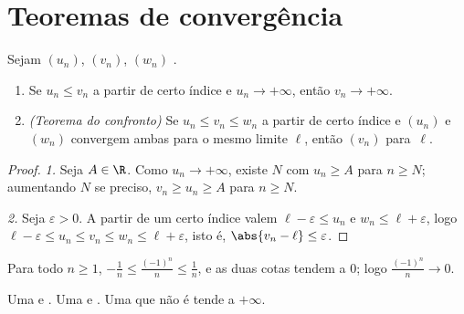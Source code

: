 \section{Teoremas de convergência}

\begin{theorem}\label{thm:g12:seq:squeeze}
Sejam $(u_n)$, $(v_n)$, $(w_n)$ .
\begin{enumerate}
  \item Se $u_n \leq v_n$ a partir de certo índice e $u_n \to +\infty$,
        então $v_n \to +\infty$.
  \item \emph{(Teorema do confronto)} Se
        $u_n \leq v_n \leq w_n$ a partir de certo índice e $(u_n)$ e
        $(w_n)$ convergem ambas para o mesmo limite $\ell$, então $(v_n)$
         para~$\ell$.
\end{enumerate}
\end{theorem}

\begin{proof}
\emph{1.} Seja $A \in \R$. Como $u_n \to +\infty$, existe $N$ com
$u_n \geq A$ para $n \geq N$; aumentando $N$ se preciso,
$v_n \geq u_n \geq A$ para $n \geq N$.

\emph{2.} Seja $\varepsilon > 0$. A partir de um certo índice valem
$\ell - \varepsilon \leq u_n$ e $w_n \leq \ell + \varepsilon$, logo
$\ell - \varepsilon \leq u_n \leq v_n \leq w_n \leq \ell + \varepsilon$,
isto é, $\abs{v_n - \ell} \leq \varepsilon$.
\end{proof}

\begin{example}
Para todo $n \geq 1$,
$-\frac{1}{n} \leq \frac{(-1)^n}{n} \leq \frac{1}{n}$, e as duas cotas
tendem a $0$; logo $\frac{(-1)^n}{n} \to 0$.
\end{example}

\begin{theorem}\label{thm:g12:seq:monotone}
Uma   e  . Uma 
 e  . Uma   que
não é  tende a $+\infty$.
\end{theorem}

